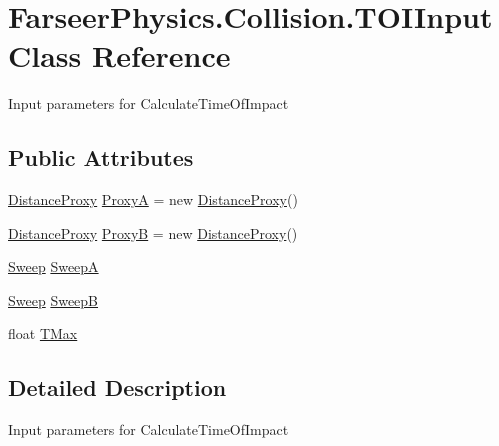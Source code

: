 \hypertarget{class_farseer_physics_1_1_collision_1_1_t_o_i_input}{\section{Farseer\+Physics.\+Collision.\+T\+O\+I\+Input Class Reference}
\label{class_farseer_physics_1_1_collision_1_1_t_o_i_input}
}


Input parameters for Calculate\+Time\+Of\+Impact  


\subsection*{Public Attributes}
\begin{DoxyCompactItemize}
\item 
\hyperlink{class_farseer_physics_1_1_collision_1_1_distance_proxy}{Distance\+Proxy} \hyperlink{class_farseer_physics_1_1_collision_1_1_t_o_i_input_a2856086baf6506e872079b9b8bfce84e}{Proxy\+A} = new \hyperlink{class_farseer_physics_1_1_collision_1_1_distance_proxy}{Distance\+Proxy}()
\item 
\hyperlink{class_farseer_physics_1_1_collision_1_1_distance_proxy}{Distance\+Proxy} \hyperlink{class_farseer_physics_1_1_collision_1_1_t_o_i_input_a8210117093c9f90ff9704988ed43c407}{Proxy\+B} = new \hyperlink{class_farseer_physics_1_1_collision_1_1_distance_proxy}{Distance\+Proxy}()
\item 
\hyperlink{struct_farseer_physics_1_1_common_1_1_sweep}{Sweep} \hyperlink{class_farseer_physics_1_1_collision_1_1_t_o_i_input_a47a708283bfc8e89215083c68c9fe2f2}{Sweep\+A}
\item 
\hyperlink{struct_farseer_physics_1_1_common_1_1_sweep}{Sweep} \hyperlink{class_farseer_physics_1_1_collision_1_1_t_o_i_input_ada33efadd1850595690ea6cf16bc62b8}{Sweep\+B}
\item 
float \hyperlink{class_farseer_physics_1_1_collision_1_1_t_o_i_input_a11f7e5d89d1063764a2b4ffa8539c824}{T\+Max}
\end{DoxyCompactItemize}


\subsection{Detailed Description}
Input parameters for Calculate\+Time\+Of\+Impact 



